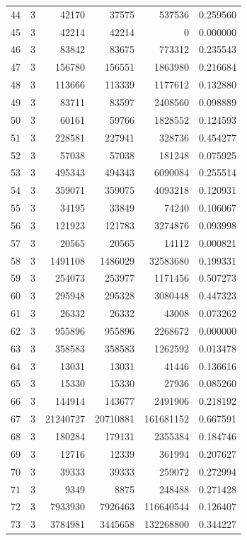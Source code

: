 \begin{longtable}{rrrrrr}
44 & 3 & 42170 & 37575 & 537536 & 0.259560\\
45 & 3 & 42214 & 42214 & 0 & 0.000000\\
46 & 3 & 83842 & 83675 & 773312 & 0.235543\\
47 & 3 & 156780 & 156551 & 1863980 & 0.216684\\
48 & 3 & 113666 & 113339 & 1177612 & 0.132880\\
49 & 3 & 83711 & 83597 & 2408560 & 0.098889\\
50 & 3 & 60161 & 59766 & 1828552 & 0.124593\\
51 & 3 & 228581 & 227941 & 328736 & 0.454277\\
52 & 3 & 57038 & 57038 & 181248 & 0.075925\\
53 & 3 & 495343 & 494343 & 6090084 & 0.255514\\
54 & 3 & 359071 & 359075 & 4093218 & 0.120931\\
55 & 3 & 34195 & 33849 & 74240 & 0.106067\\
56 & 3 & 121923 & 121783 & 3274876 & 0.093998\\
57 & 3 & 20565 & 20565 & 14112 & 0.000821\\
58 & 3 & 1491108 & 1486029 & 32583680 & 0.199331\\
59 & 3 & 254073 & 253977 & 1171456 & 0.507273\\
60 & 3 & 295948 & 295328 & 3080448 & 0.447323\\
61 & 3 & 26332 & 26332 & 43008 & 0.073262\\
62 & 3 & 955896 & 955896 & 2268672 & 0.000000\\
63 & 3 & 358583 & 358583 & 1262592 & 0.013478\\
64 & 3 & 13031 & 13031 & 41446 & 0.136616\\
65 & 3 & 15330 & 15330 & 27936 & 0.085260\\
66 & 3 & 144914 & 143677 & 2491906 & 0.218192\\
67 & 3 & 21240727 & 20710881 & 161681152 & 0.667591\\
68 & 3 & 180284 & 179131 & 2355384 & 0.184746\\
69 & 3 & 12716 & 12339 & 361994 & 0.207627\\
70 & 3 & 39333 & 39333 & 259072 & 0.272994\\
71 & 3 & 9349 & 8875 & 248488 & 0.271428\\
72 & 3 & 7933930 & 7926463 & 116640544 & 0.126407\\
73 & 3 & 3784981 & 3445658 & 132268800 & 0.344227\\

\end{longtable}
